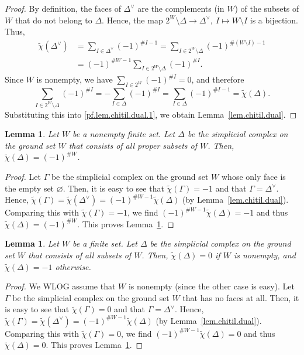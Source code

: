 \documentclass[12pt]{amsart}
\newtheorem{lemma}[theorem]{Lemma}
\theoremstyle{definition}
\newenvironment{verlong}{}{}
\newcommand{\tup}[1]{\left( #1 \right)}
\newcommand{\chitil}{\widetilde{\chi}}
\begin{document}
\begin{proof}
By definition, the faces of $\Delta^\vee$
are the complements (in $W$) of the subsets of $W$ that do not belong to $\Delta$.
Hence, the map $2^W \setminus \Delta \to \Delta^\vee, \  I \mapsto W \setminus I$
is a bijection.
Thus, 
\begin{align}
\chitil\tup{\Delta^\vee} &= \sum_{I \in \Delta^\vee} \tup{-1}^{\# I - 1} =  \sum_{I \in 2^W \setminus \Delta} \tup{-1}^{\# \tup{W \setminus I} - 1} \nonumber\\
&=  \tup{-1}^{\# W - 1} \sum_{I \in 2^W \setminus \Delta} \tup{-1}^{\# I }.
\label{pf.lem.chitil.dual.1}
\end{align}
Since $W$ is nonempty, we have $\sum_{I \in 2^W} \tup{-1}^{\# I} = 0$, and therefore 
\[
\sum_{I \in 2^W \setminus \Delta} \tup{-1}^{\# I } = - \sum_{I \in \Delta} \tup{-1}^{\# I } = \sum_{I \in \Delta} \tup{-1}^{\# I - 1 } = \chitil\tup{\Delta}.
\]
Substituting this into \eqref{pf.lem.chitil.dual.1}, we obtain Lemma~\ref{lem.chitil.dual}.
\end{proof}

\begin{verlong}
\begin{lemma} \label{lem.chitil.sphere}
Let $W$ be a nonempty finite set.
Let $\Delta$ be the simplicial complex on the ground set $W$ that consists of all proper subsets of $W$.
Then, $\chitil\tup{\Delta} = \tup{-1}^{\# W}$.
\end{lemma}

\begin{proof}
Let $\Gamma$ be the simplicial complex on the ground set $W$ whose only face is the empty set $\varnothing$.
Then, it is easy to see that $\chitil\tup{\Gamma} = -1$ and that $\Gamma = \Delta^\vee$. Hence, $\chitil\tup{\Gamma} = \chitil\tup{\Delta^\vee} = \tup{-1}^{\# W - 1} \chitil\tup{\Delta}$ (by Lemma~\ref{lem.chitil.dual}).
Comparing this with $\chitil\tup{\Gamma} = -1$, we find $\tup{-1}^{\# W - 1} \chitil\tup{\Delta} = -1$ and thus
$\chitil\tup{\Delta} = \tup{-1}^{\# W}$.
This proves Lemma~\ref{lem.chitil.sphere}.
\end{proof}

\begin{lemma} \label{lem.chitil.ball}
Let $W$ be a finite set.
Let $\Delta$ be the simplicial complex on the ground set $W$ that consists of all subsets of $W$.
Then, $\chitil\tup{\Delta} = 0$ if $W$ is nonempty, and $\chitil\tup{\Delta} = -1$ otherwise.
\end{lemma}

\begin{proof}
We WLOG assume that $W$ is nonempty (since the other case is easy).
Let $\Gamma$ be the simplicial complex on the ground set $W$ that has no faces at all.
Then, it is easy to see that $\chitil\tup{\Gamma} = 0$ and that $\Gamma = \Delta^\vee$. Hence, $\chitil\tup{\Gamma} = \chitil\tup{\Delta^\vee} = \tup{-1}^{\# W - 1} \chitil\tup{\Delta}$ (by Lemma~\ref{lem.chitil.dual}).
Comparing this with $\chitil\tup{\Gamma} = 0$, we find $\tup{-1}^{\# W - 1} \chitil\tup{\Delta} = 0$ and thus
$\chitil\tup{\Delta} = 0$.
This proves Lemma~\ref{lem.chitil.ball}.
\end{proof}
\end{verlong}
\end{document}
